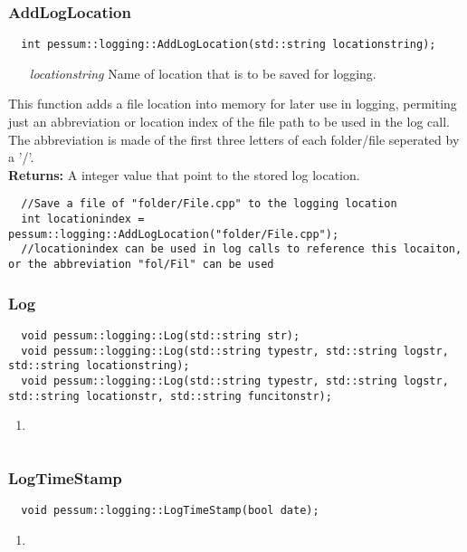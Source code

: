 \documentclass{subfiles}
\begin{document}
\subsubsection{AddLogLocation}
\begin{lstlisting}
  int pessum::logging::AddLogLocation(std::string locationstring);
\end{lstlisting}
\begin{enumerate}
	\item[\emph{locationstring}] Name of location that is to be saved for logging.
\end{enumerate}
This function adds a file location into memory for later use in logging, permiting just an abbreviation or location index of the file path to be used in the log call. The abbreviation is made of the first three letters of each folder/file seperated by a '/'.\\
\textbf{Returns:} A integer value that point to the stored log location.
\begin{lstlisting}
  //Save a file of "folder/File.cpp" to the logging location
  int locationindex = pessum::logging::AddLogLocation("folder/File.cpp");
  //locationindex can be used in log calls to reference this locaiton, or the abbreviation "fol/Fil" can be used
\end{lstlisting}
\newpage
\subsubsection{Log}
\begin{lstlisting}
  void pessum::logging::Log(std::string str);
  void pessum::logging::Log(std::string typestr, std::string logstr, std::string locationstring);
  void pessum::logging::Log(std::string typestr, std::string logstr, std::string locationstr, std::string funcitonstr);
\end{lstlisting}
\begin{enumerate}
	\item
\end{enumerate}
\begin{lstlisting}

\end{lstlisting}
\newpage
\subsubsection{LogTimeStamp}
\begin{lstlisting}
  void pessum::logging::LogTimeStamp(bool date);
\end{lstlisting}
\begin{enumerate}
	\item
\end{enumerate}
\begin{lstlisting}

\end{lstlisting}
\newpage
\end{document}
